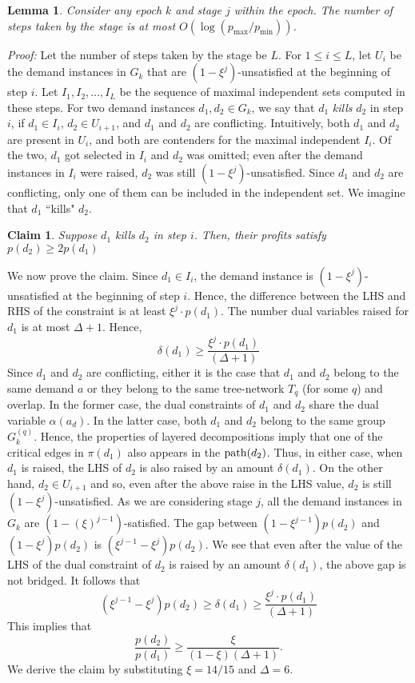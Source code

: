 \documentclass[11pt]{article}
\newtheorem{lemma}[theorem]{\bf Lemma}
\newtheorem{claim}[theorem]{\bf Claim}
\newcommand{\proof} {{\it Proof: }}
\newcommand{\mypath} {{\rm path}}
\begin{document}
\begin{lemma}
\label{lem:EEE}
Consider any epoch $k$ and stage $j$ within the epoch.
The number of steps taken by the stage is at most $O(\log(p_{\max}/p_{\min}))$.
\end{lemma}
\proof
Let the number of steps taken by the stage be $L$.
For $1\leq i\leq L$, let $U_i$ be the demand instances in $G_k$ that
are $(1-\xi^j)$-unsatisfied at the beginning of step $i$.
Let $I_1, I_2, \ldots, I_L$ be the sequence of maximal independent sets computed in these steps.
For two demand instances $d_1, d_2\in G_k$, we say that $d_1$ {\em kills} $d_2$ in step $i$,
if $d_1\in I_i$, $d_2\in U_{i+1}$, and $d_1$ and $d_2$ are conflicting.
Intuitively, both $d_1$ and $d_2$ are present in $U_i$, and both are contenders for the maximal independent $I_i$.
Of the two, $d_1$ got selected in $I_i$ and $d_2$ was omitted;
even after the demand instances in $I_i$ were raised, $d_2$ was still $(1-\xi^j)$-unsatisfied.
Since $d_1$ and $d_2$ are conflicting, only one of them can be included in the independent set. 
We imagine that $d_1$ ``kills" $d_2$.

\begin{claim}
Suppose $d_1$ kills $d_2$ in step $i$. Then, their profits satisfy $p(d_2)\geq 2p(d_1)$
\end{claim}

We now prove the claim. Since $d_1\in I_i$, the demand instance is $(1-\xi^j)$-unsatisfied
at the beginning of step $i$. Hence, the difference between the LHS and RHS 
of the constraint is at least $\xi^j\cdot p(d_1)$. The number dual variables raised for $d_1$ is at most $\Delta+1$.
Hence, 
\[
\delta(d_1)\geq \frac{\xi^j\cdot p(d_1)}{(\Delta+1)}
\]
Since $d_1$ and $d_2$ are conflicting, either it is the case that $d_1$ and $d_2$ belong to the same demand $a$
or they belong to the same tree-network $T_q$ (for some $q$) and overlap. 
In the former case, the dual constraints of $d_1$ and $d_2$ share the dual variable $\alpha(a_d)$.
In the latter case, both $d_1$ and $d_2$ belong to the same group $G^{(q)}_k$. 
Hence, the properties of layered decompositions imply that
one of the critical edges in $\pi(d_1)$ also appears in the $\mypath(d_2)$.
Thus, in either case, when $d_1$ is raised, the LHS of $d_2$ is also raised by an amount $\delta(d_1)$.
On the other hand, $d_2\in U_{i+1}$ and so, even after the above raise in the LHS value,
$d_2$ is still $(1-\xi^j)$-unsatisfied. As we are considering stage $j$,
all the demand instances in $G_k$ are $(1-(\xi)^{j-1})$-satisfied.
The gap between $(1-\xi^{j-1})p(d_2)$ and $(1-\xi^j)p(d_2)$ is $(\xi^{j-1} - \xi^j)p(d_2)$.
We see that even after the value of the LHS of the dual constraint of $d_2$ is raised by an amount $\delta(d_1)$,
the above gap is not bridged.  It follows that 
\[
(\xi^{j-1} - \xi^j) p(d_2) \geq \delta(d_1) \geq \frac{\xi^j\cdot p(d_1)}{(\Delta+1)}
\]
This implies that
\[
\frac{p(d_2)}{p(d_1)} \geq \frac{\xi}{(1-\xi)(\Delta + 1)}.
\]
We derive the claim by substituting $\xi=14/15$ and $\Delta=6$.
\end{document}
